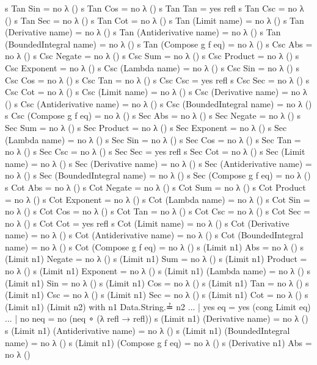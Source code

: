 \documentclass{report}
\begin{document}
\begin{code}
    s Tan Sin = no λ ()
    s Tan Cos = no λ ()
    s Tan Tan = yes refl
    s Tan Csc = no λ ()
    s Tan Sec = no λ ()
    s Tan Cot = no λ ()
    s Tan (Limit name) = no λ ()
    s Tan (Derivative name) = no λ ()
    s Tan (Antiderivative name) = no λ ()
    s Tan (BoundedIntegral name) = no λ ()
    s Tan (Compose g f eq) = no λ ()
    s Csc Abs = no λ ()
    s Csc Negate = no λ ()
    s Csc Sum = no λ ()
    s Csc Product = no λ ()
    s Csc Exponent = no λ ()
    s Csc (Lambda name) = no λ ()
    s Csc Sin = no λ ()
    s Csc Cos = no λ ()
    s Csc Tan = no λ ()
    s Csc Csc = yes refl
    s Csc Sec = no λ ()
    s Csc Cot = no λ ()
    s Csc (Limit name) = no λ ()
    s Csc (Derivative name) = no λ ()
    s Csc (Antiderivative name) = no λ ()
    s Csc (BoundedIntegral name) = no λ ()
    s Csc (Compose g f eq) = no λ ()
    s Sec Abs = no λ ()
    s Sec Negate = no λ ()
    s Sec Sum = no λ ()
    s Sec Product = no λ ()
    s Sec Exponent = no λ ()
    s Sec (Lambda name) = no λ ()
    s Sec Sin = no λ ()
    s Sec Cos = no λ ()
    s Sec Tan = no λ ()
    s Sec Csc = no λ ()
    s Sec Sec = yes refl
    s Sec Cot = no λ ()
    s Sec (Limit name) = no λ ()
    s Sec (Derivative name) = no λ ()
    s Sec (Antiderivative name) = no λ ()
    s Sec (BoundedIntegral name) = no λ ()
    s Sec (Compose g f eq) = no λ ()
    s Cot Abs = no λ ()
    s Cot Negate = no λ ()
    s Cot Sum = no λ ()
    s Cot Product = no λ ()
    s Cot Exponent = no λ ()
    s Cot (Lambda name) = no λ ()
    s Cot Sin = no λ ()
    s Cot Cos = no λ ()
    s Cot Tan = no λ ()
    s Cot Csc = no λ ()
    s Cot Sec = no λ ()
    s Cot Cot = yes refl
    s Cot (Limit name) = no λ ()
    s Cot (Derivative name) = no λ ()
    s Cot (Antiderivative name) = no λ ()
    s Cot (BoundedIntegral name) = no λ ()
    s Cot (Compose g f eq) = no λ ()
    s (Limit n1) Abs = no λ ()
    s (Limit n1) Negate = no λ ()
    s (Limit n1) Sum = no λ ()
    s (Limit n1) Product = no λ ()
    s (Limit n1) Exponent = no λ ()
    s (Limit n1) (Lambda name) = no λ ()
    s (Limit n1) Sin = no λ ()
    s (Limit n1) Cos = no λ ()
    s (Limit n1) Tan = no λ ()
    s (Limit n1) Csc = no λ ()
    s (Limit n1) Sec = no λ ()
    s (Limit n1) Cot = no λ ()
    s (Limit n1) (Limit n2) with n1 Data.String.≟ n2
    ... | yes eq = yes (cong Limit eq)
    ... | no neq = no (neq ∘ (λ {refl → refl}))
    s (Limit n1) (Derivative name) = no λ ()
    s (Limit n1) (Antiderivative name) = no λ ()
    s (Limit n1) (BoundedIntegral name) = no λ ()
    s (Limit n1) (Compose g f eq) = no λ ()
    s (Derivative n1) Abs = no λ ()

\end{code}
\end{document}
